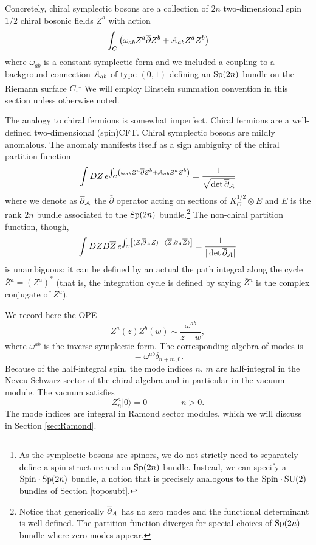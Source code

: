 \documentclass[11pt,a4paper]{article}
\begin{document}
Concretely, chiral symplectic bosons are a collection of $2 n$ two-dimensional spin $1/2$ chiral bosonic fields $Z^a$ with action 
\begin{equation}
\int_{C}\left( \omega_{ab} Z^a \bar\partial Z^b + {\cal A}_{ab} Z^a Z^b\right)
\end{equation}
where $\omega_{ab}$ is a constant symplectic form and we included a coupling to a background  
 connection ${\cal A}_{ab}$ of type $(0,1)$ defining an $\Sp(2n)$ bundle on the Riemann surface $C$.\footnote{As the symplectic bosons are spinors, we do not strictly need to separately define a spin structure and  an $\Sp(2n)$ bundle. Instead, we can specify a $\Spin\cdot \Sp(2n)$ bundle, a notion that is precisely analogous
 to the $\Spin\cdot \SU(2)$ bundles of Section \ref{toposubt}.} We will employ Einstein summation convention in this section unless otherwise noted. 
 
 The analogy to chiral fermions is somewhat imperfect. Chiral fermions are a well-defined two-dimensional (spin)CFT. 
Chiral symplectic bosons are mildly anomalous. The anomaly manifests itself as a sign ambiguity of the chiral partition function
\begin{equation}
\int DZ \,e^{\int_{C}\left( \omega_{ab} Z^a \bar\partial Z^b + {\cal A}_{ab} Z^a Z^b\right)} = \frac{1}{\sqrt{\det \bar \partial_{\cal A} }}
\end{equation}
where we denote as $\bar \partial_{\cal A}$ the $\bar \partial$ operator acting on sections of $K_C^{1/2} \otimes E$ and $E$ is the rank $2n$ bundle associated to the $\Sp(2n)$ bundle.\footnote{Notice that generically $\bar \partial_{\cal A}$ has no zero modes and the functional determinant is well-defined. The partition function diverges for special choices of $\Sp(2n)$ bundle where zero modes appear. } 
The non-chiral partition function, though, 
\begin{equation}
\int DZ D\bar Z\, e^{\int_C \left[\langle Z, \bar \partial_A Z \rangle -  \langle 
\bar Z, \partial_A \bar Z \rangle\right]} =  \frac{1}{|\det \bar \partial_{\cal A} |}
\end{equation}
is unambiguous: it can be defined by an actual the path integral along the cycle $\bar Z{}^a = (Z^a)^*$ (that is, the integration cycle is defined by saying $\bar Z{}^a$ is the complex conjugate of $Z^a$).

We record here the OPE
\begin{equation}
Z^a(z) Z^b(w) \sim \frac{\omega^{ab}}{z-w},
\end{equation}
where $\omega^{ab}$ is the inverse symplectic form. The corresponding algebra of modes is 
\begin{equation}
[Z^a_m, Z^b_n] = \omega^{ab} \delta_{n+m,0}.
\end{equation}
Because of the half-integral spin, the mode indices $n$, $m$ are half-integral in the Neveu-Schwarz sector of the chiral algebra and in particular in the vacuum module. The vacuum satisfies 
\begin{equation}
Z^a_n |0\rangle =0 \qquad \qquad n>0.
\end{equation}
The mode indices are integral in Ramond sector modules, which we will discuss in Section \ref{sec:Ramond}.
\end{document}
